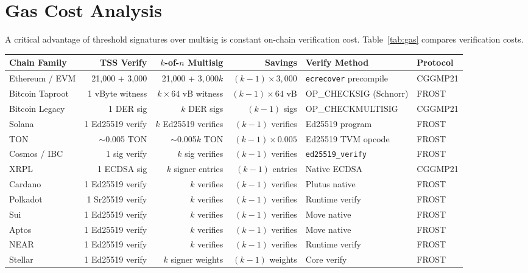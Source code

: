 \section{Gas Cost Analysis}

\label{sec:gas}

A critical advantage of threshold signatures over multisig is constant on-chain
verification cost. Table~\ref{tab:gas} compares verification costs.

\begin{table}[t]
\centering
\small
\begin{tabular}{@{}lrrrll@{}}
\toprule
\textbf{Chain Family} & \textbf{TSS Verify} & \textbf{$k$-of-$n$ Multisig} & \textbf{Savings} & \textbf{Verify Method} & \textbf{Protocol} \\
\midrule
Ethereum / EVM & 21,000 + 3,000 & 21,000 + $3{,}000k$ & $(k{-}1) \times 3{,}000$ & \texttt{ecrecover} precompile & CGGMP21 \\
Bitcoin Taproot & 1 vByte witness & $k \times 64$ vB witness & $(k{-}1) \times 64$ vB & OP\_CHECKSIG (Schnorr) & FROST \\
Bitcoin Legacy & 1 DER sig & $k$ DER sigs & $(k{-}1)$ sigs & OP\_CHECKMULTISIG & CGGMP21 \\
Solana & 1 Ed25519 verify & $k$ Ed25519 verifies & $(k{-}1)$ verifies & Ed25519 program & FROST \\
TON & $\sim$0.005 TON & $\sim$0.005$k$ TON & $(k{-}1) \times 0.005$ & Ed25519 TVM opcode & FROST \\
Cosmos / IBC & 1 sig verify & $k$ sig verifies & $(k{-}1)$ verifies & \texttt{ed25519\_verify} & FROST \\
XRPL & 1 ECDSA sig & $k$ signer entries & $(k{-}1)$ entries & Native ECDSA & CGGMP21 \\
Cardano & 1 Ed25519 verify & $k$ verifies & $(k{-}1)$ verifies & Plutus native & FROST \\
Polkadot & 1 Sr25519 verify & $k$ verifies & $(k{-}1)$ verifies & Runtime verify & FROST \\
Sui & 1 Ed25519 verify & $k$ verifies & $(k{-}1)$ verifies & Move native & FROST \\
Aptos & 1 Ed25519 verify & $k$ verifies & $(k{-}1)$ verifies & Move native & FROST \\
NEAR & 1 Ed25519 verify & $k$ verifies & $(k{-}1)$ verifies & Runtime verify & FROST \\
Stellar & 1 Ed25519 verify & $k$ signer weights & $(k{-}1)$ weights & Core verify & FROST \\

\end{tabular}
\end{table}
